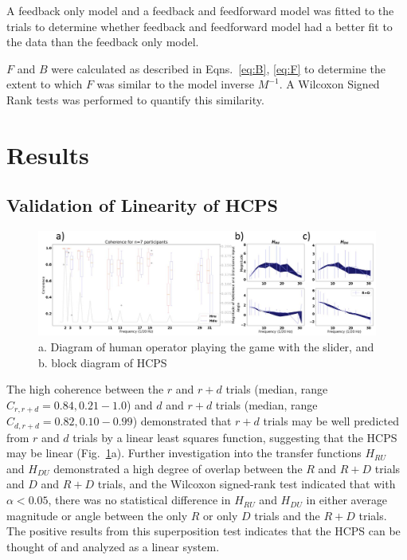 \documentclass{ifacconf}
\begin{document}
A feedback only model and a feedback and feedforward model was fitted to the trials to determine whether feedback and feedforward model had a better fit to the data than the feedback only model. 

$F$ and $B$ were calculated as described in Eqns.~\ref{eq:B}, \ref{eq:F} to determine the extent to which $F$ was similar to the model inverse $M^{-1}$. A Wilcoxon Signed Rank tests was performed to quantify this similarity.

\section{Results}

\subsection{Validation of Linearity of HCPS}
\begin{figure}[t]
\begin{center}
\includegraphics[width=16.8cm]{linearity.jpg}    %
\caption{a. Diagram of human operator playing the game with the slider, and b. block diagram of HCPS} 
\label{fig:linearity}
\end{center}
\end{figure}

The high coherence between the $r$ and $r+d$ trials (median, range $C_{r,r+d} = 0.84, 0.21-1.0$) and $d$ and $r+d$ trials (median, range $C_{d,r+d} = 0.82, 0.10-0.99$) demonstrated that $r+d$ trials may be well predicted from $r$ and $d$ trials by a linear least squares function, suggesting that the HCPS may be linear (Fig.~\ref{fig:linearity}a). Further investigation into the transfer functions $H_{RU}$ and $H_{DU}$ demonstrated a high degree of overlap between the $R$ and $R+D$ trials and $D$ and $R+D$ trials, and the Wilcoxon signed-rank test indicated that with $\alpha<0.05$, there was no statistical difference in $H_{RU}$ and $H_{DU}$ in either average magnitude or angle between the only $R$ or only $D$ trials and the $R+D$ trials. The positive results from this superposition test indicates that the HCPS can be thought of and analyzed as a linear system. 
\end{document}
